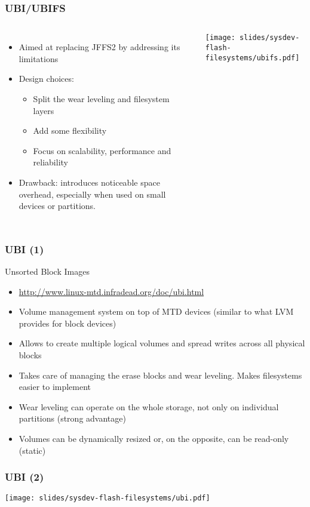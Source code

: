 \begin{frame}
  \frametitle{UBI/UBIFS}
  \begin{columns}
    \begin{itemize}
    \item Aimed at replacing JFFS2 by addressing its limitations
    \item Design choices:
      \begin{itemize}
      \item Split the wear leveling and filesystem layers
      \item Add some flexibility
      \item Focus on scalability, performance and reliability
      \end{itemize}
    \item Drawback: introduces noticeable space overhead,
      especially when used on small devices or partitions.
    \end{itemize}
    \texttt{[image: slides/sysdev-flash-filesystems/ubifs.pdf]}
  \end{columns}
\end{frame}

\begin{frame}
  \frametitle{UBI (1)}
  Unsorted Block Images
  \begin{itemize}
  \item \url{http://www.linux-mtd.infradead.org/doc/ubi.html}
  \item Volume management system on top of MTD devices (similar to
    what LVM provides for block devices)
  \item Allows to create multiple logical volumes and spread writes
    across all physical blocks
  \item Takes care of managing the erase blocks and wear
    leveling. Makes filesystems easier to implement
  \item Wear leveling can operate on the whole storage,
    not only on individual partitions (strong advantage)
  \item Volumes can be dynamically resized or, on the opposite, can be
    read-only (static)
  \end{itemize}
\end{frame}

\begin{frame}
  \frametitle{UBI (2)}
  \begin{center}
    \texttt{[image: slides/sysdev-flash-filesystems/ubi.pdf]}
  \end{center}
\end{frame}

